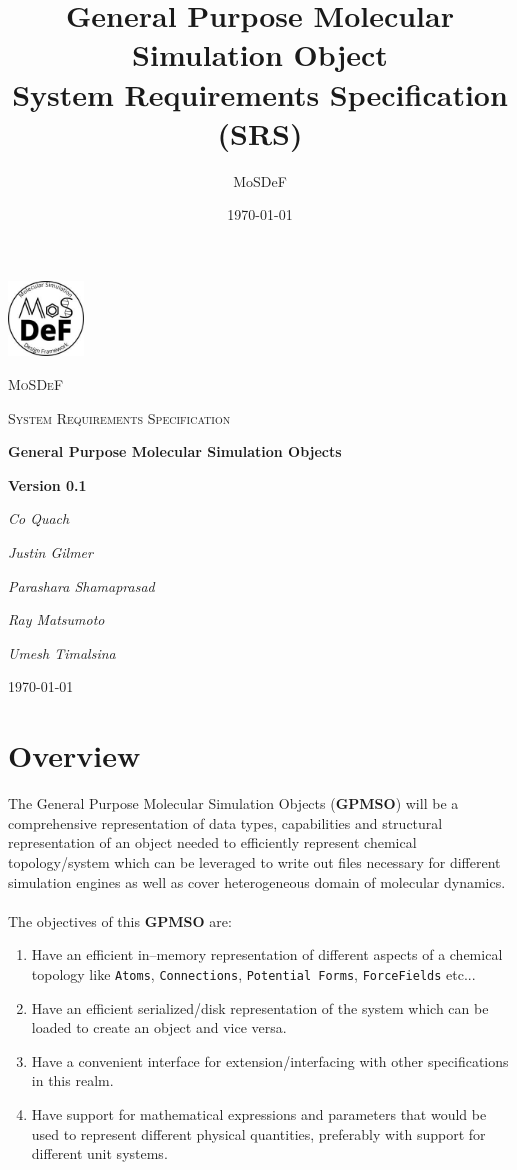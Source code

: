 \documentclass[12pt]{article}
\title{General Purpose Molecular Simulation Object\\ System Requirements Specification (SRS)}
\author{MoSDeF}
\date{\today}
\begin{document}
\begin{titlepage}
	\centering
	\includegraphics[width=0.15\textwidth]{logo}\par\vspace{1cm}
	{\scshape\LARGE MoSDeF \par}
	\vspace{1cm}
	{\scshape\Large System Requirements Specification\par}
	\vspace{1.5cm}
	{\huge\bfseries General Purpose Molecular Simulation Objects\par}
	\vspace{1cm}
	{\huge\bfseries Version 0.1\par}
	\vspace{2cm}
	{\Large\itshape Co Quach\par}
	{\Large\itshape Justin Gilmer\par}
	{\Large\itshape Parashara Shamaprasad\par}
	{\Large\itshape Ray Matsumoto\par}
	{\Large\itshape Umesh Timalsina\par}

	\vfill

	{\large \today\par}
\end{titlepage}

{\centering \section*{Overview}}

The General Purpose Molecular Simulation Objects (\textbf{GPMSO}) will be a comprehensive representation of data types, capabilities and structural representation of an object needed to efficiently represent chemical topology/system which can be leveraged to write out files necessary for different simulation engines as well as cover heterogeneous domain of molecular dynamics. \\~\\
The objectives of this \textbf{GPMSO} are:
\begin{enumerate}
    \item Have an efficient in--memory representation of different aspects of a chemical topology like \texttt{Atoms}, \texttt{Connections}, \texttt{Potential Forms}, \texttt{ForceFields} etc...
    \item Have an efficient serialized/disk representation of the system which can be loaded to create an object and vice versa.
    \item Have a convenient interface for extension/interfacing with other specifications in this realm.
    \item Have support for mathematical expressions and parameters that would be used to represent different physical quantities, preferably with support for different unit systems.
\end{enumerate}
\end{document}
